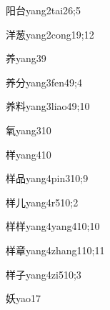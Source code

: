 \begin{verbete}{阳台}{yang2tai2}{6;5}
\end{verbete}

\begin{verbete}{洋葱}{yang2cong1}{9;12}
\end{verbete}

\begin{verbete}{养}{yang3}{9}
\end{verbete}

\begin{verbete}{养分}{yang3fen4}{9;4}
\end{verbete}

\begin{verbete}{养料}{yang3liao4}{9;10}
\end{verbete}

\begin{verbete}{氧}{yang3}{10}
\end{verbete}

\begin{verbete}{样}{yang4}{10}
\end{verbete}

\begin{verbete}{样品}{yang4pin3}{10;9}
\end{verbete}

\begin{verbete}{样儿}{yang4r5}{10;2}
\end{verbete}

\begin{verbete}{样样}{yang4yang4}{10;10}
\end{verbete}

\begin{verbete}{样章}{yang4zhang1}{10;11}
\end{verbete}

\begin{verbete}{样子}{yang4zi5}{10;3}
\end{verbete}

\begin{verbete}{妖}{yao1}{7}
\end{verbete}

